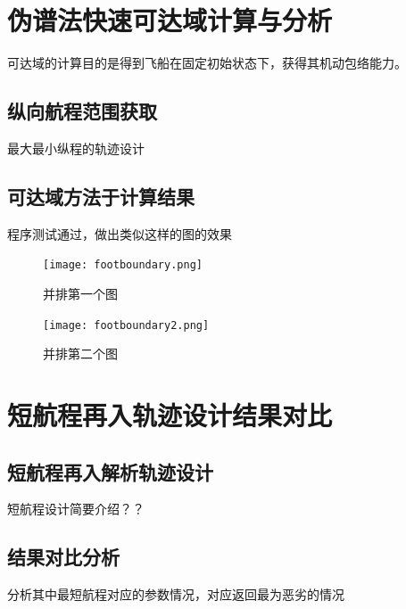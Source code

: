 \section{伪谱法快速可达域计算与分析}
可达域的计算目的是得到飞船在固定初始状态下，获得其机动包络能力。
\subsection{纵向航程范围获取}
最大最小纵程的轨迹设计
\subsection{可达域方法于计算结果}
程序测试通过，做出类似这样的图的效果
\begin{figure}[htb]
	\begin{minipage}{0.48\textwidth}
		\centering
		\texttt{[image: footboundary.png]}
		\caption{并排第一个图}
		\label{fig:parallel1}
	\end{minipage}\hfill
	\begin{minipage}{0.48\textwidth}
		\centering
		\texttt{[image: footboundary2.png]}
		\caption{并排第二个图}
		\label{fig:parallel2}
	\end{minipage}
\end{figure}

\section{短航程再入轨迹设计结果对比}
\subsection{短航程再入解析轨迹设计}
短航程设计简要介绍？？
\subsection{结果对比分析}
分析其中最短航程对应的参数情况，对应返回最为恶劣的情况
